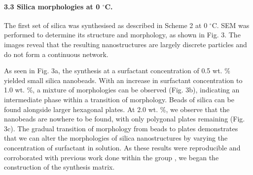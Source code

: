 \documentclass[a4paper,12pt,twocolumn]{article}
\begin{document}
	
  	
  	\paragraph{3.3 Silica morphologies at 0 $^\circ$C.} The first set of silica was synthesised as described in Scheme 2 at 0 $^\circ$C. SEM was performed to determine its structure and morphology, as shown in Fig. 3. The images reveal that the resulting nanostructures are largely discrete particles and do not form a continuous network.
  	
  	As seen in Fig. 3a, the synthesis at a surfactant concentration of 0.5 wt. \% yielded small silica nanobeads. With an increase in surfactant concentration to 1.0 wt. \%, a mixture of morphologies can be observed (Fig. 3b), indicating an intermediate phase within a transition of morphology. Beads of silica can be found alongside larger hexagonal plates. At 2.0 wt. \%, we observe that the nanobeads are nowhere to be found, with only polygonal plates remaining (Fig. 3c). The gradual transition of morphology from beads to plates demonstrates that we can alter the morphologies of silica nanostructures by varying the concentration of surfactant in solution. As these results were reproducible and corroborated with previous work done within the group \cite{yong2017}, we began the construction of the synthesis matrix.
  	
  	\begin{figure}[h!]
  	\noindent%
	\begin{minipage}{\linewidth}%
	\end{minipage}
	\end{figure}
  	
\end{document}
